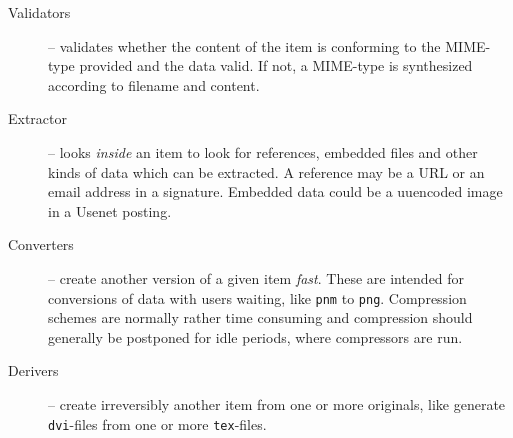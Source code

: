 \begin{description}

\item[Validators] -- validates whether the content
  of the item is conforming to the MIME-type provided and
  the data valid.  If not, a MIME-type is synthesized
  according to filename and content.




\item[Extractor] -- looks \textit{inside} an item to look
  for references, embedded files and other kinds of data
  which can be extracted.  A reference may be a URL or an
  email address in a signature.  Embedded data could be a
  uuencoded image in a Usenet posting.

\item[Converters] -- create another version of a given item
  \textit{fast}.  These are intended for conversions of data
  with users waiting, like \texttt{pnm} to \texttt{png}.
  Compression schemes are normally rather time consuming and
  compression should generally be postponed for idle
  periods, where compressors are run.



\item[Derivers] -- create irreversibly
another item from one or more
  originals, like generate \texttt{dvi}-files
  from one or more \texttt{tex}-files.




\end{description}
